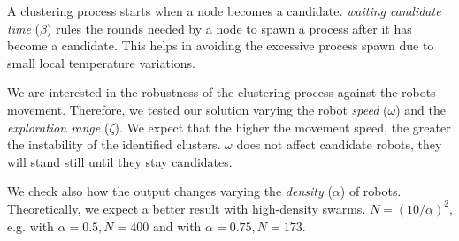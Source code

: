 A clustering process starts when a node becomes a candidate.
 \emph{waiting candidate time} ($\beta$) rules the rounds needed by a node to spawn a process after it has become a candidate.
 This helps in avoiding the excessive process spawn due to small local temperature variations.

We are interested in the robustness of the clustering process against the robots movement. Therefore, we tested our
 solution varying the robot \emph{speed} ($\omega$) and the \emph{exploration range} ($\zeta$).
 We expect that the higher the movement speed, the greater the instability of the identified clusters.
 $\omega$ does not affect candidate robots, they will stand still until they stay candidates.

We check also how the output changes varying the \emph{density} ($\alpha$) of robots.
 Theoretically, we expect a better result with high-density swarms.
$
 N = (10 / \alpha) ^ 2
$,
e.g. with $\alpha = 0.5, N = 400$ and with $\alpha = 0.75, N = 173$.

